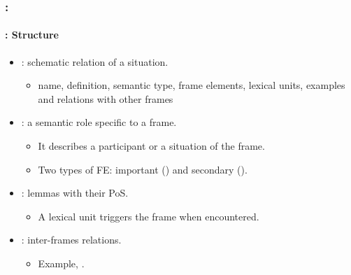 \documentclass[xcolor=table]{beamer}
\begin{document}
\begin{frame}
	\frametitle{\insertshortsubtitle: \insertsection}
	\framesubtitle{\insertsubsection: Structure}
	
	\begin{itemize}
		\item {}: schematic relation of a situation.
		\begin{itemize}
			\item name, definition, semantic type, frame elements, lexical units, examples and relations with other frames
		\end{itemize}
	
		\item {}: a semantic role specific to a frame. 
		\begin{itemize}
			\item It describes a participant or a situation of the frame.
			\item Two types of FE: important () and secondary ().
		\end{itemize}
	
		\item {}: lemmas with their PoS.
		\begin{itemize}
			\item A lexical unit triggers the frame when encountered.
		\end{itemize}
	
		\item {}: inter-frames relations.
		\begin{itemize}
			\item Example, .
		\end{itemize}
	\end{itemize}
	
\end{frame}
\end{document}
